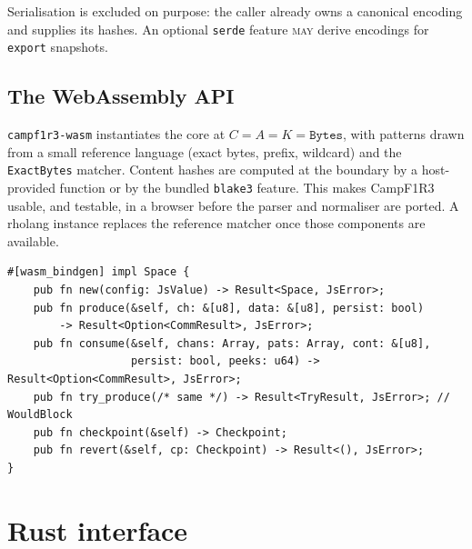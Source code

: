 \documentclass[11pt]{article}
\theoremstyle{plain}
\theoremstyle{definition}
\newcommand{\Camp}{CampF1R3}
\newcommand{\MAY}{\textsc{may}}
\newcommand{\code}[1]{\texttt{#1}}
\begin{document}
Serialisation is excluded on purpose: the caller already owns a canonical encoding and
supplies its hashes. An optional \code{serde} feature \MAY{} derive encodings for
\code{export} snapshots.

\subsection{The WebAssembly API}\label{sec:wasmapi}

\code{campf1r3-wasm} instantiates the core at
$C=A=K=\code{Bytes}$, with patterns drawn from a small reference language (exact
bytes, prefix, wildcard) and the \code{ExactBytes} matcher. Content hashes are
computed at the boundary by a host-provided function or by the bundled
\code{blake3} feature. This makes \Camp{} usable, and testable, in a browser before the
parser and normaliser are ported. A rholang instance replaces the reference matcher
once those components are available.

\begin{lstlisting}
#[wasm_bindgen] impl Space {
    pub fn new(config: JsValue) -> Result<Space, JsError>;
    pub fn produce(&self, ch: &[u8], data: &[u8], persist: bool)
        -> Result<Option<CommResult>, JsError>;
    pub fn consume(&self, chans: Array, pats: Array, cont: &[u8],
                   persist: bool, peeks: u64) -> Result<Option<CommResult>, JsError>;
    pub fn try_produce(/* same */) -> Result<TryResult, JsError>; // WouldBlock
    pub fn checkpoint(&self) -> Checkpoint;
    pub fn revert(&self, cp: Checkpoint) -> Result<(), JsError>;
}
\end{lstlisting}

\section{Rust interface}\label{sec:api}
\end{document}
